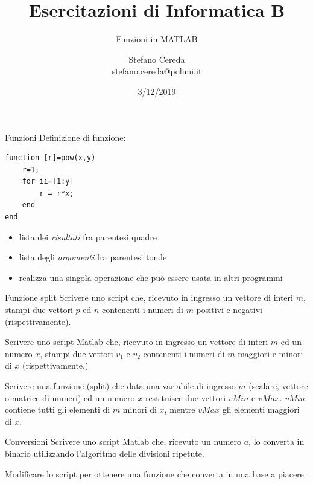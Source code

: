 \documentclass[aspectratio=169, ]{beamer}
\title{Esercitazioni di Informatica B}
\subtitle{Funzioni in MATLAB}
\author{Stefano Cereda\\
	stefano.cereda@polimi.it
}
\date{3/12/2019}
\institute[PoliMi]{Politecnico Milano}
\begin{document}
\begin{frame}
    \maketitle
\end{frame}

\begin{frame}[fragile]{Funzioni}
    Definizione di funzione:
    \begin{lstlisting}[style=matlab]
function [r]=pow(x,y)
    r=1;
    for ii=[1:y]
        r = r*x;
    end
end
    \end{lstlisting}
    \begin{itemize}
        \item lista dei \emph{risultati} fra parentesi quadre
        \item lista degli \emph{argomenti} fra parentesi tonde
        \item realizza una singola operazione che può essere usata in altri programmi
    \end{itemize}
\end{frame}

\begin{frame}{Funzione split}
    Scrivere uno script che, ricevuto in ingresso un vettore di interi $m$, stampi due vettori $p$ ed $n$ contenenti i
    numeri di $m$ positivi e negativi (rispettivamente).

    \pause
    Scrivere uno script Matlab che, ricevuto in ingresso un vettore di interi $m$ ed un numero $x$, stampi due vettori $v_1$ e $v_2$ contenenti i numeri di $m$ maggiori e minori di $x$ (rispettivamente.)

    \pause
    Scrivere una funzione (split) che data una variabile di ingresso $m$ (scalare, vettore o
    matrice di numeri) ed un numero $x$ restituisce due vettori $vMin$ e $vMax$. $vMin$
    contiene tutti gli elementi di $m$ minori di $x$, mentre $vMax$ gli elementi maggiori
    di $x$.
\end{frame}

\begin{frame}{Conversioni}
    Scrivere uno script Matlab che, ricevuto un numero $a$, lo converta in binario utilizzando l'algoritmo delle divisioni ripetute.

    Modificare lo script per ottenere una funzione che converta in una base a piacere.
\end{frame}
\end{document}
